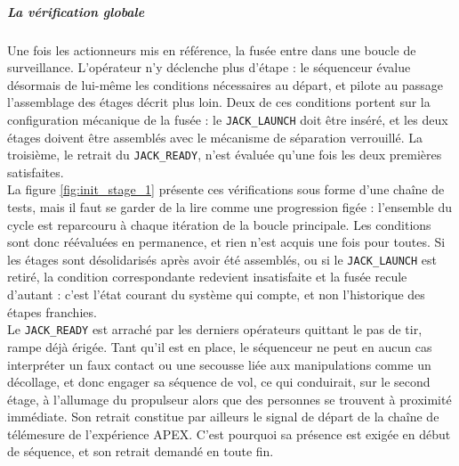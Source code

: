 \newpage

\subparagraph*{La vérification globale} Une fois les actionneurs mis en référence, la fusée entre dans une boucle de
surveillance. L'opérateur n'y déclenche plus d'étape : le séquenceur évalue désormais de lui-même les conditions nécessaires au
départ, et pilote au passage l'assemblage des étages décrit plus loin. Deux de ces conditions portent sur la configuration
mécanique de la fusée : le \texttt{JACK\_LAUNCH} doit être inséré, et les deux étages doivent être assemblés avec le mécanisme
de séparation verrouillé. La troisième, le retrait du \texttt{JACK\_READY}, n'est évaluée qu'une fois les deux premières
satisfaites.\\
 
La figure \ref{fig:init_stage_1} présente ces vérifications sous forme d'une chaîne de tests, mais il faut se garder de la lire
comme une progression figée : l'ensemble du cycle est reparcouru à chaque itération de la boucle principale. Les conditions sont
donc réévaluées en permanence, et rien n'est acquis une fois pour toutes. Si les étages sont désolidarisés après avoir été
assemblés, ou si le \texttt{JACK\_LAUNCH} est retiré, la condition correspondante redevient insatisfaite et la fusée recule
d'autant : c'est l'état courant du système qui compte, et non l'historique des étapes franchies.\\
 
Le \texttt{JACK\_READY} est arraché par les derniers opérateurs quittant le pas de tir, rampe déjà érigée. Tant qu'il est en
place, le séquenceur ne peut en aucun cas interpréter un faux contact ou une secousse liée aux manipulations comme un décollage,
et donc engager sa séquence de vol, ce qui conduirait, sur le second étage, à l'allumage du propulseur alors que des personnes
se trouvent à proximité immédiate. Son retrait constitue par ailleurs le signal de départ de la chaîne de télémesure de
l'expérience APEX. C'est pourquoi sa présence est exigée en début de séquence, et son retrait demandé en toute fin.

